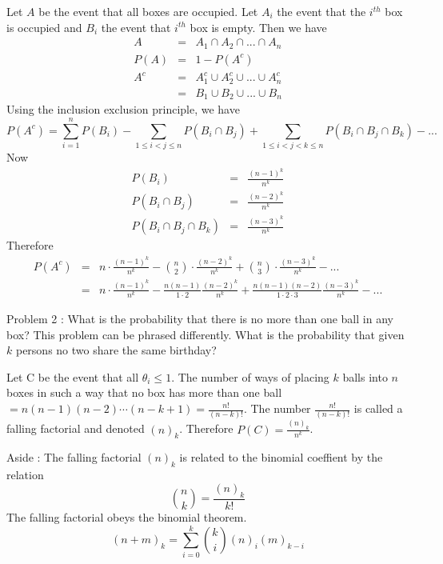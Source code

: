 Let $A$ be the event that all boxes are occupied. Let $A_{i}$ the event that the $i^{th}$ box is occupied and $B_{i}$ the event that $i^{th}$ box is empty. Then we have
\begin{eqnarray*}
A & = & A_{1} \cap A_{2} \cap ... \cap A_{n}\\
P(A) & = & 1-P(A^{c})\\
A^{c} & = & A_{1}^{c} \cup  A_{2}^{c} \cup ... \cup A_{n}^{c}\\
& = & B_{1} \cup B_{2} \cup ... \cup B_{n}
\end{eqnarray*}
\noindent Using the inclusion exclusion principle, we have
\[
P(A^{c}) = \sum_{i=1}^{n}P(B_{i}) - \sum_{1 \leq i < j \leq n}P(B_{i} \cap B_{j}) + \sum_{1 \leq i < j < k \leq n}P(B_{i} \cap B_{j} \cap B_{k}) - ...
\]
Now 
\begin{eqnarray*}
P(B_{i}) & = & \frac{(n-1)^{k}}{n^{k}}\\
P(B_{i} \cap B_{j}) & = & \frac{(n-2)^{k}}{n^{k}}\\
P(B_{i} \cap B_{j} \cap B_{k}) & = & \frac{(n-3)^{k}}{n^{k}}
\end{eqnarray*}
Therefore 
\begin{eqnarray*}
P(A^{c}) & = & n \cdot \frac{(n-1)^{k}}{n^{k}} - {{n}\choose{2}} \cdot \frac{(n-2)^{k}}{n^{k}} + {{n}\choose{3}} \cdot \frac{(n-3)^{k}}{n^{k}} - ...\\
& = & n \cdot \frac{(n-1)^{k}}{n^{k}} - \frac{n(n-1)}{1 \cdot 2}\frac{(n-2)^{k}}{n^{k}} + \frac{n(n-1)(n-2)}{1 \cdot 2 \cdot 3}\frac{(n-3)^{k}}{n^{k}} - ...
\end{eqnarray*}

\noindent Problem 2 : What is the probability that there is no more than one ball in any box? This problem can be phrased differently. What is the probability that given $k$ persons no two share the same birthday?

Let C be the event that all $\theta_{i} \leq 1$. The number of ways of placing $k$ balls into $n$ boxes in such a way that no box has more than one ball $= n(n-1)(n-2) \cdots (n-k+1) = \frac{n!}{(n-k)!}$. The number $\frac{n!}{(n-k)!}$ is called a falling factorial and denoted $(n)_{k}$. Therefore $P(C) = \frac{(n)_{k}}{n^{k}}$.
 
\vspace{12pt}
\noindent Aside : The falling factorial $(n)_{k}$ is related to the binomial coeffient by the relation \[{{n}\choose{k}} = \frac{(n)_{k}}{k!}\]
 The falling factorial obeys the binomial theorem.
\[ (n+m)_{k} = \sum_{i=0}^{k}{{k}\choose{i}}(n)_{i}(m)_{k-i} \]

